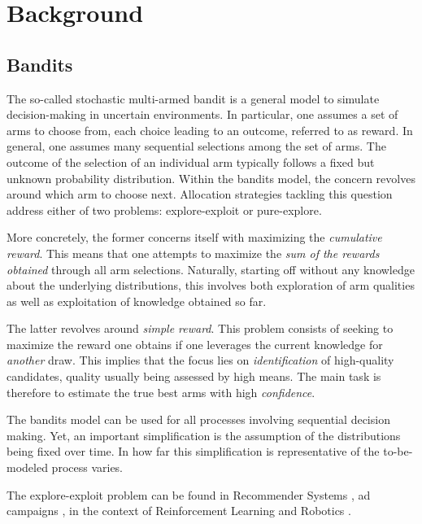\chapter{Background}\label{chapter:background}

\section{Bandits}
The so-called stochastic multi-armed bandit is a general model to simulate
decision-making in uncertain environments. In particular, one assumes a set of
arms to choose from, each choice leading to an outcome, referred
to as reward. In general, one assumes many sequential selections among the set
of arms. The outcome of the selection of an individual arm typically follows a
fixed but unknown probability distribution.
Within the bandits model, the concern revolves around which arm to choose next.
Allocation strategies tackling this question address either of two problems:
explore-exploit or pure-explore.

More concretely, the former concerns itself with maximizing the \emph{cumulative
reward}. This means that one attempts to maximize the \emph{sum of the rewards
obtained} through all arm selections. Naturally, starting off without any
knowledge about the underlying distributions, this involves both exploration of
arm qualities as well as exploitation of knowledge obtained so far.

The latter revolves around \emph{simple reward}. This problem consists of
seeking to maximize the reward one obtains if one leverages the current
knowledge for \emph{another} draw. This implies that the focus lies on
\emph{identification} of high-quality candidates, quality usually being assessed
by high means. The main task is therefore to estimate the true best arms
with high \emph{confidence}.

The bandits model can be used for all processes involving sequential decision
making. Yet, an important simplification is the assumption of the distributions
being fixed over time. In how far this simplification is representative of the
to-be-modeled process varies.

The explore-exploit problem can be found in Recommender Systems \cite{McInerney:2018:EEE:3240323.3240354}, ad campaigns \cite{5360225},
in the context of Reinforcement Learning
\cite{DBLP:journals/corr/abs-1811-12560} \cite{Szepesvari:2010:ARL:1855083} and
Robotics \cite{Baldassano}.


